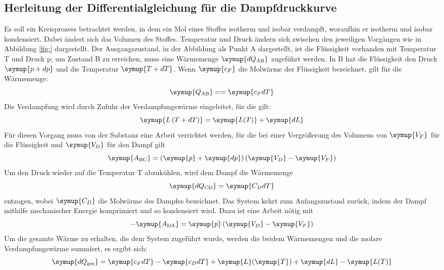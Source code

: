 \subsection{Herleitung der Differentialgleichung für die Dampfdruckkurve}
Es soll ein Kreisprozess betrachtet werden, in dem ein Mol eines Stoffes isotherm und isobar verdampft, 
woraufhin er isotherm und isobar kondensiert. Dabei ändert sich das Volumen des Stoffes. Temperatur
und Druck ändern sich zwischen den jeweiligen Vorgängen wie in Abbildung \ref{fig:} dargestellt.
Der Ausgangszustand, in der Abbildung als Punkt A dargestellt, ist die Flüssigkeit vorhanden mit 
Temperatur T und Druck p; um Zustand B zu erreichen, muss eine Wärmemenge $\symup{dQ_\text{AB}}$
zugeführt werden. In B hat die Flüssigkeit den Druck $\symup{p + dp}$ und die Temperatur $\symup{T + dT}$.
Wenn $\symup{c_F}$ die Molwärme der Flüssigkeit bezeichnet, gilt für die Wärmemenge:
\begin{equation}
\symup{Q_\text{AB}} =  = \symup{c_F dT}
\end{equation}
Die Verdampfung wird durch Zufuhr der Verdampfungswärme eingeleitet, für die gilt:
\begin{equation}
\symup{L \left( T + dT \right)} = \symup{L(T)} + \symup{dL}
\end{equation}
Für diesen Vorgang muss von der Substanz eine Arbeit verrichtet werden, für die bei einer Vergrößerung
des Volumens von $\symup{V_F}$ für die Flüssigkeit und $\symup{V_D}$ für den Dampf gilt
\begin{equation}
\symup{A_\text{BC}} = \left( \symup{p} + \symup{dp} \right) \left( \symup{V_D} - \symup{V_F} \right)
\end{equation}
Um den Druck wieder auf die Temperatur T abzukühlen, wird dem Dampf die Wärmemenge
\begin{equation}
\symup{dQ_\text{CD}} = \symup{C_D dT}
\end{equation}
entzogen, wobei $\symup{C_D}$ die Molwärme des Dampfes bezeichnet. Das System kehrt zum Anfangszustand
zurück, indem der Dampf mithilfe mechanischer Energie komprimiert und so kondensiert wird. Dazu ist 
eine Arbeit nötig mit
\begin{equation}
- \symup{A_{\text{DA}}} = \symup{p} \left( \symup{V_D} - \symup{V_F} \right)
\end{equation}
Um die gesamte Wärme zu erhalten, die dem System zugeführt wurde, werden die beidem Wärmemengen und
die molare Verdampfungswärme summiert, es ergibt sich:
\begin{equation}
\symup{dQ_\text{ges}} = \symup{c_F dT} - \symup{c_D dT} + \symup{L}(\symup{T}) + \symup{dL} - \symup{L(T)}
\end{equation}
